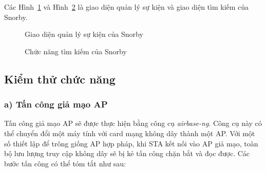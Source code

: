 Các Hình~\ref{fig:snorby-events} và Hình~\ref{fig:snorby-search} là giao diện quản lý sự kiện và giao diện tìm kiếm của Snorby.

\begin{figure}[H]
    \centering
    \caption{
        \label{fig:snorby-events}
        Giao diện quản lý sự kiện của Snorby}
\end{figure}

\begin{figure}[H]
    \centering
    \caption{
        \label{fig:snorby-search}
        Chức năng tìm kiếm của Snorby}
\end{figure}

\subsection{Kiểm thử chức năng} \label{subsection:kiem-thu-chuc-nang}
\subsubsection*{a) Tấn công giả mạo AP}
Tấn công giả mạo AP sẽ được thực hiện bằng công cụ \emph{airbase-ng}. Công cụ này có thể chuyển đổi một máy tính với card mạng không dây thành một AP. Với một số thiết lập để trông giống AP hợp pháp, khi STA kết nối vào AP giả mạo, toàn bộ lưu lượng truy cập không dây sẽ bị kẻ tấn công chặn bắt và đọc được. Các bước tấn công có thể tóm tắt như sau:

